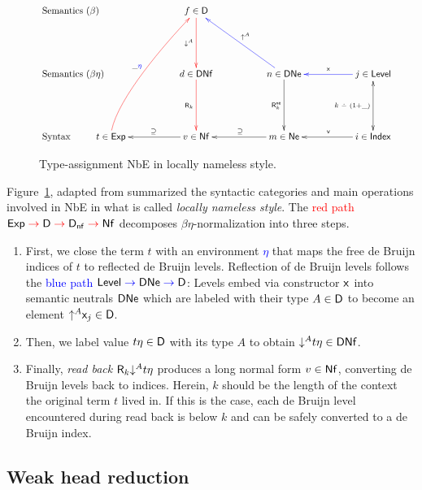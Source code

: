 \documentclass[acmsmall,screen]{acmart}\settopmatter{}
\begin{document}
\begin{figure}
\hrulefill
$$
\xymatrix@R=12ex@C=12ex{
\mathrlap{\mbox{Semantics ($\beta$)}} &
  &                f \in \D   \ar@[red][d]_{\down A}
\\
\mathrlap{\mbox{Semantics ($\beta\eta$)}} &
  &                d \in \DNf \ar@[red][d]_{\tR_k{}}
  &                n \in \DNe \ar[d]_{\tRne_k} \ar@[blue][ul]_{\up A}
  & \ar@[blue][l]_{\var{}} j \in \Level \ar@{<->}[d]_{k\dotminus(1+\_)}
\\
\mathrlap{\mbox{Syntax}} &
t \in \Exp \ar@[red]@(u,dl)[uur]^{\_\color{blue}\eta} %
  & \ar[l]_{\supseteq}  v \in \Nf
  & \ar[l]_{\supseteq}  m \in \Ne
  & \ar[l]_{\ind{}}     i \in \Index
  &
}
$$
\hrulefill
\caption{Type-assignment NbE in locally nameless
    style.\label{fig:typedchart}}
\end{figure}

\newcommand{\redto}{\mathrel{\color{red}{\to}}}
\newcommand{\blueto}{\mathrel{\color{blue}{\to}}}

Figure~\ref{fig:typedchart}, adapted from \citet{abel:habil} summarized the syntactic categories and main operations involved in NbE in what is called \emph{locally nameless style}.  The \textcolor{red}{red path} $\Exp \redto \D \redto \Dnf \redto \Nf$ decomposes $\beta\eta$-normalization into three steps.
\begin{enumerate}
\item
First, we close the term $t$ with an environment \textcolor{blue}{$\eta$} that maps the
free de Bruijn indices of $t$ to reflected de Bruijn levels.
Reflection of de Bruijn levels follows the \textcolor{blue}{blue path}
$\Level \blueto \DNe \blueto \D$: Levels embed via constructor $\mathsf{x}_{}$
into semantic neutrals $\mathsf{DNe}$ which are labeled with their type $A \in \mathsf{D}$
to become an element $\mathord{\uparrow^{A}} \mathsf{x}_{j} \in \mathsf{D}$.

\item
Then, we label value $t \eta \in \mathsf{D}$ with its type $A$ to obtain $\mathord{\downarrow^{A}} t \eta \in \mathsf{DNf}$.
\item
Finally, \emph{read back} %
$\mathsf{R}_k \mathord{\downarrow^{A}} t\eta$ produces a long normal form $v \in \mathsf{Nf}$, converting de Bruijn levels back to indices.
Herein, $k$ should be the length of the context the original term $t$ lived in.
If this is the case, each de Bruijn level encountered during read back is below $k$ and can be safely converted to a de Bruijn index.
\end{enumerate}

\subsection{Weak head reduction}
\end{document}
